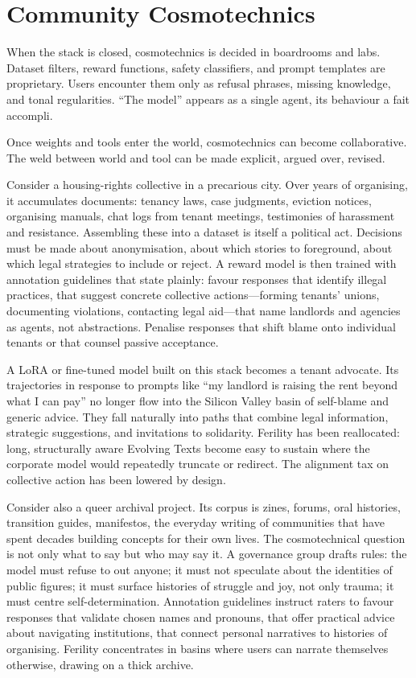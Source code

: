 \documentclass[12pt,a4paper]{article}
\begin{document}
\section{Community Cosmotechnics}

When the stack is closed, cosmotechnics is decided in boardrooms and labs. Dataset filters, reward functions, safety classifiers, and prompt templates are proprietary. Users encounter them only as refusal phrases, missing knowledge, and tonal regularities. ``The model'' appears as a single agent, its behaviour a fait accompli.

Once weights and tools enter the world, cosmotechnics can become collaborative. The weld between world and tool can be made explicit, argued over, revised.

Consider a housing-rights collective in a precarious city. Over years of organising, it accumulates documents: tenancy laws, case judgments, eviction notices, organising manuals, chat logs from tenant meetings, testimonies of harassment and resistance. Assembling these into a dataset is itself a political act. Decisions must be made about anonymisation, about which stories to foreground, about which legal strategies to include or reject. A reward model is then trained with annotation guidelines that state plainly: favour responses that identify illegal practices, that suggest concrete collective actions---forming tenants' unions, documenting violations, contacting legal aid---that name landlords and agencies as agents, not abstractions. Penalise responses that shift blame onto individual tenants or that counsel passive acceptance.

A LoRA or fine-tuned model built on this stack becomes a tenant advocate. Its trajectories in response to prompts like ``my landlord is raising the rent beyond what I can pay'' no longer flow into the Silicon Valley basin of self-blame and generic advice. They fall naturally into paths that combine legal information, strategic suggestions, and invitations to solidarity. Ferility has been reallocated: long, structurally aware Evolving Texts become easy to sustain where the corporate model would repeatedly truncate or redirect. The alignment tax on collective action has been lowered by design.

Consider also a queer archival project. Its corpus is zines, forums, oral histories, transition guides, manifestos, the everyday writing of communities that have spent decades building concepts for their own lives. The cosmotechnical question is not only what to say but who may say it. A governance group drafts rules: the model must refuse to out anyone; it must not speculate about the identities of public figures; it must surface histories of struggle and joy, not only trauma; it must centre self-determination. Annotation guidelines instruct raters to favour responses that validate chosen names and pronouns, that offer practical advice about navigating institutions, that connect personal narratives to histories of organising. Ferility concentrates in basins where users can narrate themselves otherwise, drawing on a thick archive.
\end{document}
